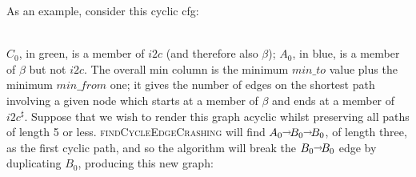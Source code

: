 \noindent
As an example, consider this cyclic \gls{cfg}:\\
\centerline{
}\\
\noindent $C_0$, in green, is a member of $i2c$ (and therefore also
$\beta$); $A_0$, in blue, is a member of $\beta$ but not $i2c$.  The
overall min column is the minimum $\mathit{min\_to}$ value plus the
minimum $\mathit{min\_from}$ one; it gives the number of edges on the
shortest path involving a given node which starts at a member of
$\beta$ and ends at a member of $i2c^\sharp$.  Suppose that we wish to
render this graph acyclic whilst preserving all paths of length 5 or
less.  \textsc{findCycleEdgeCrashing} will find $A_0 \shortrightarrow B_0
\shortrightarrow B_0$, of length three, as the first cyclic path, and so
the algorithm will break the $B_0 \shortrightarrow B_0$ edge by
duplicating $B_0$, producing this new graph:\\
